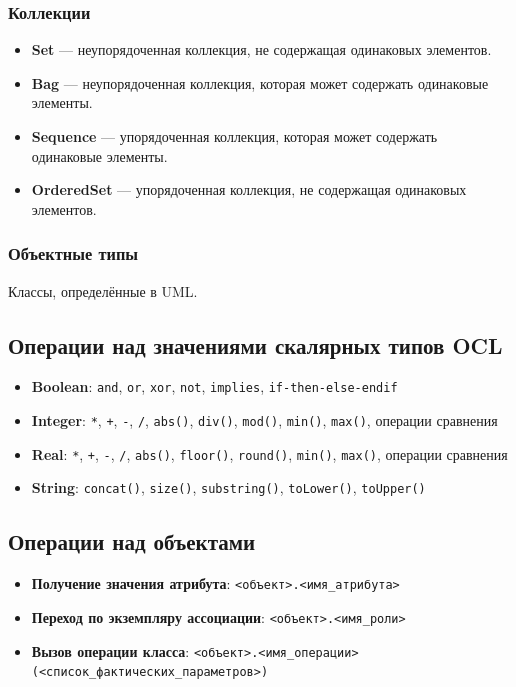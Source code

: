 \documentclass[a4paper,12pt]{article}
\begin{document}
\subsubsection{Коллекции}
\begin{itemize}
    \item \textbf{Set} — неупорядоченная коллекция, не содержащая одинаковых элементов.
    \item \textbf{Bag} — неупорядоченная коллекция, которая может содержать одинаковые элементы.
    \item \textbf{Sequence} — упорядоченная коллекция, которая может содержать одинаковые элементы.
    \item \textbf{OrderedSet} — упорядоченная коллекция, не содержащая одинаковых элементов.
\end{itemize}

\subsubsection{Объектные типы}
Классы, определённые в UML.

\subsection{Операции над значениями скалярных типов OCL}

\begin{itemize}
    \item \textbf{Boolean}: \texttt{and}, \texttt{or}, \texttt{xor}, \texttt{not}, \texttt{implies}, \texttt{if-then-else-endif}
    \item \textbf{Integer}: \texttt{*}, \texttt{+}, \texttt{-}, \texttt{/}, \texttt{abs()}, \texttt{div()}, \texttt{mod()}, \texttt{min()}, \texttt{max()}, операции сравнения
    \item \textbf{Real}: \texttt{*}, \texttt{+}, \texttt{-}, \texttt{/}, \texttt{abs()}, \texttt{floor()}, \texttt{round()}, \texttt{min()}, \texttt{max()}, операции сравнения
    \item \textbf{String}: \texttt{concat()}, \texttt{size()}, \texttt{substring()}, \texttt{toLower()}, \texttt{toUpper()}
\end{itemize}

\subsection{Операции над объектами}

\begin{itemize}
    \item \textbf{Получение значения атрибута}: \texttt{<объект>.<имя\_атрибута>}
    \item \textbf{Переход по экземпляру ассоциации}: \texttt{<объект>.<имя\_роли>}
    \item \textbf{Вызов операции класса}: \texttt{<объект>.<имя\_операции>(<список\_фактических\_параметров>)}
\end{itemize}
\end{document}
